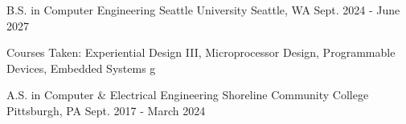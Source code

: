 

\begin{cventries}

  \cventry
    {B.S. in Computer Engineering} %
    {Seattle University} %
    {Seattle, WA} %
    {Sept. 2024 - June 2027} %
    {
      \begin{cvitems} %
        \item {Courses Taken: Experiential Design III, Microprocessor Design, Programmable Devices, Embedded Systems g}
      \end{cvitems}
    }

  \cventry
    {A.S. in Computer \& Electrical Engineering} %
    {Shoreline Community College	} %
    {Pittsburgh, PA} %
    {Sept. 2017 - March 2024} %
    {
      \begin{cvitems} %
      \end{cvitems}
    }
    
\end{cventries}
